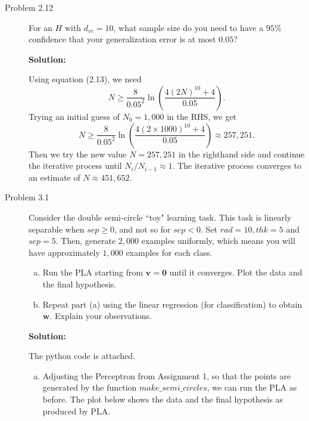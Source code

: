 \documentclass[a4paper]{article}
\begin{document}
\begin {description}
\item[Problem 2.12] For an $H$ with $d_{vc} = 10$, what sample size do you need to have a $95\%$ confidence that your generalization error is at most $0.05$?

\smallskip

\textbf{Solution:}
\begin{doublespace}
Using equation (2.13), we need
\[N \geq \frac{8}{0.05^2} \ln \left( \frac{4(2N)^{10}+4}{0.05} \right).\]
Trying an initial guess of $N_0= 1,000$ in the RHS, we get
\[N \geq \frac{8}{0.05^2} \ln \left( \frac{4(2\times1000)^{10}+4}{0.05} \right) \approx 257,251.\] 
Then we try the new value $N = 257,251$ in the righthand side and continue the iterative process until $N_i/N_{i-1} \approx 1$. The iterative process converges to an estimate of $N \approx 451,652$.
\end{doublespace}

\newpage

\item[Problem 3.1] Consider the double semi-circle ``toy" learning task. This task is linearly separable when $sep \geq 0$, and not so for $sep < 0$. Set $rad =10, thk = 5$ and $sep = 5$. Then, generate $2,000$ examples uniformly, which means you will have approximately $1,000$ examples for each class.
\begin{enumerate}[(a)]
\item Run the PLA starting from $\mathbf{v} = \mathbf{0}$ until it converges. Plot the data and the final hypothesis.
\item Repeat part (a) using the linear regression (for classification) to obtain $\mathbf{w}$. Explain your observations.
\end{enumerate}

\smallskip

\textbf{Solution:}
\begin{doublespace}
The python code is attached.
\begin{enumerate}[(a)]
\item Adjusting the Perceptron from Assignment 1, so that the points are generated by the function $make\_semi\_circles$, we can run the PLA as before. The plot below shows the data and the final hypothesis as produced by PLA.


\end{enumerate}
\end{doublespace}
\end{description}
\end{document}
